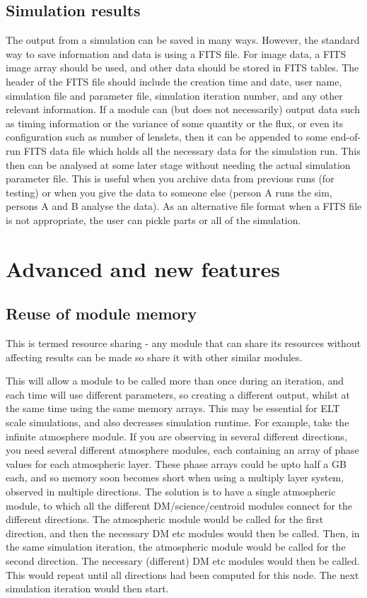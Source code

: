 \documentclass{article}
\begin{document}
\subsection{Simulation results}
The output from a simulation can be saved in many ways.  However, the
standard way to save information and data is using a FITS file.  For
image data, a FITS image array should be used, and other data should
be stored in FITS tables.  The header of the FITS file should include
the creation time and date, user name, simulation file and parameter
file, simulation iteration number, and any other relevant information.
If a module can (but does not necessarily) output data such as timing
information or the variance of some quantity or the flux, or even its
configuration such as number of lenslets, then it can be appended to
some end-of-run FITS data file which holds all the necessary data for
the simulation run. This then can be analysed at some later stage
without needing the actual simulation parameter file.  This is useful
when you archive data from previous runs (for testing) or when you
give the data to someone else (person A runs the sim, persons A and B
analyse the data).  As an alternative file format when a FITS file is
not appropriate, the user can pickle parts or all of the simulation.

\section{Advanced and new features}
\subsection{Reuse of module memory}
This is termed resource sharing - any module that can share its
resources without affecting results can be made so share it with other
similar modules.

This will allow a module to be called more than once during an
iteration, and each time will use different parameters, so creating a
different output, whilst at the same time using the same memory
arrays.  This may be essential for ELT scale simulations, and also
decreases simulation runtime.  For example, take the infinite
atmosphere module.  If you are observing in several different
directions, you need several different atmosphere modules, each
containing an array of phase values for each atmospheric layer.  These
phase arrays could be upto half a GB each, and so memory soon becomes
short when using a multiply layer system, observed in multiple
directions.  The solution is to have a single atmospheric module, to
which all the different DM/science/centroid modules connect for the
different directions.  The atmospheric module would be called for the
first direction, and then the necessary DM etc modules would then be
called.  Then, in the same simulation iteration, the atmospheric
module would be called for the second direction.  The necessary
(different) DM etc modules would then be called.  This would repeat
until all directions had been computed for this node.  The next
simulation iteration would then start.
\end{document}
